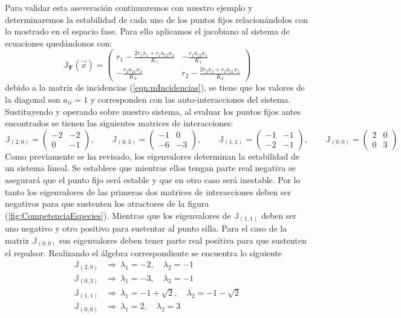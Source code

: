 \setlength{\parindent}{0cm}Para validar esta aseveración continuaremos con nuestro ejemplo y determinaremos la estabilidad de cada uno de los puntos fijos relacionándolos con lo mostrado en el espacio fase. Para ello aplicamos el jacobiano al sistema de ecuaciones quedándonos con:
\begin{equation}\label{eqn:Jacobiano2}
	\mathbb{J}_\mathbf{F}(\vec{x})=\begin{pmatrix}
		r_1-\frac{2r_1x_1+r_1a_{12}x_2}{K_1} & -\frac{r_1a_{12}x_1}{K_1}\\
		-\frac{r_2a_{21}x_2}{K_2} & r_2-\frac{2r_2x_2+r_2a_{21}x_1}{K_2}
	\end{pmatrix}
\end{equation}
debido a la matriz de incidencias (\ref{eqn:mIncidencias}), se tiene que los valores de la diagonal son $a_{ii}=1$ y corresponden con las auto-interacciones del sistema. Sustituyendo y operando sobre nuestro sistema, al evaluar los puntos fijos antes encontrados se tienen las siguientes matrices de interacciones:
$$
\mathbb{J}_{(2,0)} = \begin{pmatrix}
	-2 & -2\\
	0 & -1
\end{pmatrix},\qquad \mathbb{J}_{(0,3)}=\begin{pmatrix}
	-1 & 0\\
	-6 & -3
\end{pmatrix},\qquad \mathbb{J}_{(1,1)}=\begin{pmatrix}
	-1 & -1\\
	-2 & -1
\end{pmatrix},\qquad \mathbb{J}_{(0,0)}=\begin{pmatrix}
	2 & 0 \\
	0 & 3
\end{pmatrix}
$$
Como previamente se ha revisado, los eigenvalores determinan la estabilidad de un sistema lineal. Se establece que mientras ellos tengan parte real negativa se asegurará que el punto fijo será estable y que en otro caso será inestable. Por lo tanto los eigenvalores de las primeras dos matrices de interacciones deben ser negativos para que sustenten los atractores de la figura (\ref{fig:CompetenciaEspecies}). Mientras que los eigenvalores de $\mathbb{J}_{(1,1)}$ deben ser uno negativo y otro positivo para sustentar al punto silla. Para el caso de la matriz $\mathbb{J}_{(0,0)}$ sus eigenvalores deben tener parte real positiva para que sustenten el repulsor. Realizando el álgebra correspondiente se encuentra lo siguiente
\begin{align*}
	\mathbb{J}_{(2,0)}&\Longrightarrow\ \lambda_1 = -2,\quad\lambda_2 = -1\\
	\mathbb{J}_{(0,3)}&\Longrightarrow\ \lambda_1 = -3,\quad\lambda_2 = -1\\
	\mathbb{J}_{(1,1)}&\Longrightarrow\ \lambda_1 = -1+\sqrt{2},\quad\lambda_2 = -1-\sqrt{2}\\
	\mathbb{J}_{(0,0)}&\Longrightarrow\ \lambda_1 = 2,\quad\lambda_2 = 3\\
\end{align*}
